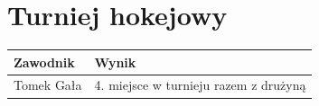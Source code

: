 \section*{Turniej hokejowy}
\begin{tabularx}{\textwidth}{@{}lX@{}}
\toprule
\textbf{Zawodnik} & \textbf{Wynik} \\
\midrule
Tomek Gała & 4. miejsce w turnieju razem z drużyną \\
\bottomrule
\end{tabularx}